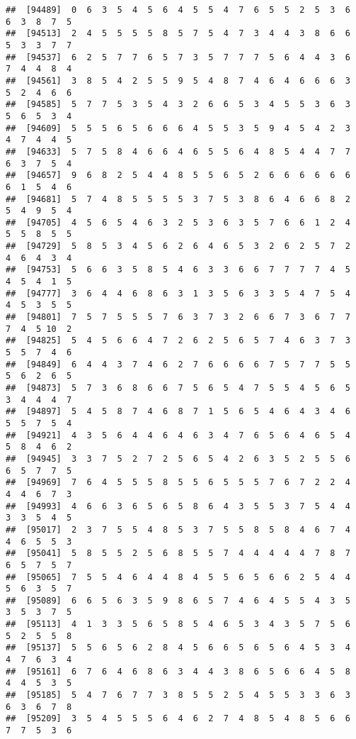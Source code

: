 \documentclass[
]{book}
\begin{document}
\begin{verbatim}
##  [94489]  0  6  3  5  4  5  6  4  5  5  4  7  6  5  5  2  5  3  6  6  3  8  7  5
##  [94513]  2  4  5  5  5  5  8  5  7  5  4  7  3  4  4  3  8  6  6  5  3  3  7  7
##  [94537]  6  2  5  7  7  6  5  7  3  5  7  7  7  5  6  4  4  3  6  7  4  4  8  4
##  [94561]  3  8  5  4  2  5  5  9  5  4  8  7  4  6  4  6  6  6  3  5  2  4  6  6
##  [94585]  5  7  7  5  3  5  4  3  2  6  6  5  3  4  5  5  3  6  3  5  6  5  3  4
##  [94609]  5  5  5  6  5  6  6  6  4  5  5  3  5  9  4  5  4  2  3  4  7  4  4  5
##  [94633]  5  7  5  8  4  6  6  4  6  5  5  6  4  8  5  4  4  7  7  6  3  7  5  4
##  [94657]  9  6  8  2  5  4  4  8  5  5  6  5  2  6  6  6  6  6  6  6  1  5  4  6
##  [94681]  5  7  4  8  5  5  5  5  3  7  5  3  8  6  4  6  6  8  2  5  4  9  5  4
##  [94705]  4  5  6  5  4  6  3  2  5  3  6  3  5  7  6  6  1  2  4  5  5  8  5  5
##  [94729]  5  8  5  3  4  5  6  2  6  4  6  5  3  2  6  2  5  7  2  4  6  4  3  4
##  [94753]  5  6  6  3  5  8  5  4  6  3  3  6  6  7  7  7  7  4  5  4  5  4  1  5
##  [94777]  3  6  4  4  6  8  6  3  1  3  5  6  3  3  5  4  7  5  4  4  5  3  5  5
##  [94801]  7  5  7  5  5  5  7  6  3  7  3  2  6  6  7  3  6  7  7  7  4  5 10  2
##  [94825]  5  4  5  6  6  4  7  2  6  2  5  6  5  7  4  6  3  7  3  5  5  7  4  6
##  [94849]  6  4  4  3  7  4  6  2  7  6  6  6  6  7  5  7  7  5  5  5  6  2  6  5
##  [94873]  5  7  3  6  8  6  6  7  5  6  5  4  7  5  5  4  5  6  5  3  4  4  4  7
##  [94897]  5  4  5  8  7  4  6  8  7  1  5  6  5  4  6  4  3  4  6  5  5  7  5  4
##  [94921]  4  3  5  6  4  4  6  4  6  3  4  7  6  5  6  4  6  5  4  5  8  4  6  2
##  [94945]  3  3  7  5  2  7  2  5  6  5  4  2  6  3  5  2  5  5  6  6  5  7  7  5
##  [94969]  7  6  4  5  5  5  8  5  5  6  5  5  5  7  6  7  2  2  4  4  4  6  7  3
##  [94993]  4  6  6  3  6  5  6  5  8  6  4  3  5  5  3  7  5  4  4  3  3  5  4  5
##  [95017]  2  3  7  5  5  4  8  5  3  7  5  5  8  5  8  4  6  7  4  4  6  5  5  3
##  [95041]  5  8  5  5  2  5  6  8  5  5  7  4  4  4  4  4  7  8  7  6  5  7  5  7
##  [95065]  7  5  5  4  6  4  4  8  4  5  5  6  5  6  6  2  5  4  4  5  6  3  5  7
##  [95089]  6  6  5  6  3  5  9  8  6  5  7  4  6  4  5  5  4  3  5  3  5  3  7  5
##  [95113]  4  1  3  3  5  6  5  8  5  4  6  5  3  4  3  5  7  5  6  5  2  5  5  8
##  [95137]  5  5  6  5  6  2  8  4  5  6  6  5  6  5  6  4  5  3  4  4  7  6  3  4
##  [95161]  6  7  6  4  6  8  6  3  4  4  3  8  6  5  6  6  4  5  8  4  4  5  3  5
##  [95185]  5  4  7  6  7  7  3  8  5  5  2  5  4  5  5  3  3  6  3  6  3  6  7  8
##  [95209]  3  5  4  5  5  5  6  4  6  2  7  4  8  5  4  8  5  6  6  7  7  5  3  6

\end{verbatim}
\end{document}
